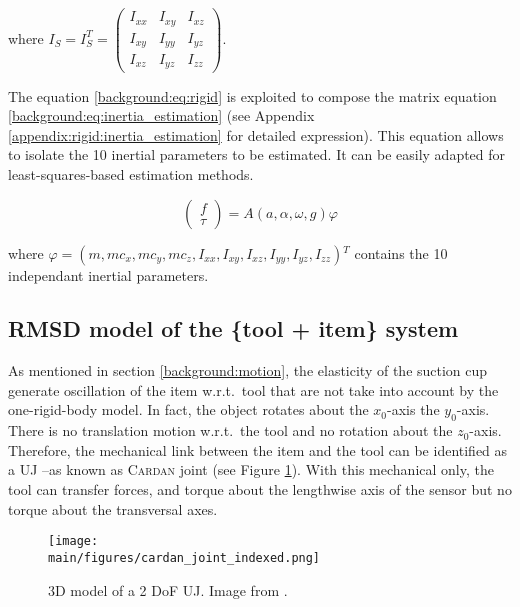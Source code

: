 \documentclass[/home/francois/latex/report/main.tex]{subfiles}
\begin{document}
where $I_S = I_S^T =
\begin{pmatrix}
 I_{xx} & I_{xy} & I_{xz} \\
 I_{xy} & I_{yy} & I_{yz} \\
 I_{xz} & I_{yz} & I_{zz}
\end{pmatrix}
$.

The equation \ref{background:eq:rigid} is exploited to compose the matrix equation \ref{background:eq:inertia_estimation} (see Appendix \ref{appendix:rigid:inertia_estimation} for detailed expression). This equation allows to isolate the 10 inertial parameters to be estimated. It can be easily adapted for least-squares-based estimation methods.

\begin{equation}
  \label{background:eq:inertia_estimation}
 \begin{pmatrix}
  f    \\
  \tau
 \end{pmatrix}
 = A(a, \alpha, \omega, g) \varphi
\end{equation}

where $\varphi = (m, m c_x, m c_y, m c_z, I_{xx}, I_{xy}, I_{xz}, I_{yy}, I_{yz}, I_{zz}) {}^T$ contains the 10 independant inertial parameters.

\subsection{\ac{RMSD} model of the \{tool + item\} system}

As mentioned in section \ref{background:motion}, the elasticity of the suction cup generate oscillation of the item w.r.t.\ tool that are not take into account by the one-rigid-body model. In fact, the object rotates about the $x_0$-axis the $y_0$-axis. There is no translation motion w.r.t.\ the tool and no rotation about the $z_0$-axis. Therefore, the mechanical link between the item and the tool can be identified as a \ac{UJ} –as known as \textsc{Cardan} joint (see Figure \ref{fig:background:cardan}). With this mechanical only, the tool can transfer forces, and torque about the lengthwise axis of the sensor but no torque about the transversal axes.

\begin{figure}
  \centering
  \texttt{[image: \\main/figures/cardan\_joint\_indexed.png]}
  \caption{3D model of a 2 \ac{DoF} \ac{UJ}. Image from \cite{3dexport2020}.}
  \label{fig:background:cardan}
\end{figure}
\end{document}
